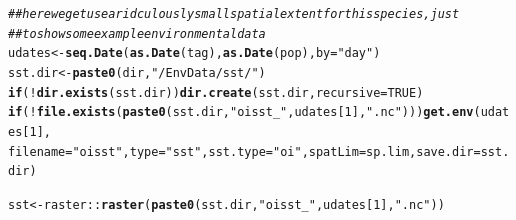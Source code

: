 \documentclass{article}\usepackage[]{graphicx}\usepackage[]{color}
\makeatletter
\newcommand{\hlnum}[1]{\textcolor[rgb]{0.686,0.059,0.569}{#1}}%
\newcommand{\hlstr}[1]{\textcolor[rgb]{0.192,0.494,0.8}{#1}}%
\newcommand{\hlcom}[1]{\textcolor[rgb]{0.678,0.584,0.686}{\textit{#1}}}%
\newcommand{\hlopt}[1]{\textcolor[rgb]{0,0,0}{#1}}%
\newcommand{\hlstd}[1]{\textcolor[rgb]{0.345,0.345,0.345}{#1}}%
\newcommand{\hlkwa}[1]{\textcolor[rgb]{0.161,0.373,0.58}{\textbf{#1}}}%
\newcommand{\hlkwb}[1]{\textcolor[rgb]{0.69,0.353,0.396}{#1}}%
\newcommand{\hlkwc}[1]{\textcolor[rgb]{0.333,0.667,0.333}{#1}}%
\newcommand{\hlkwd}[1]{\textcolor[rgb]{0.737,0.353,0.396}{\textbf{#1}}}%
\newenvironment{kframe}{%
 \def\at@end@of@kframe{}%
 \ifinner\ifhmode%
  \def\at@end@of@kframe{\end{minipage}}%
  \begin{minipage}{\columnwidth}%
 \fi\fi%
 \def\FrameCommand##1{\hskip\@totalleftmargin \hskip-\fboxsep
 \colorbox{shadecolor}{##1}\hskip-\fboxsep
     \hskip-\linewidth \hskip-\@totalleftmargin \hskip\columnwidth}%
 \MakeFramed {\advance\hsize-\width
   \@totalleftmargin\z@ \linewidth\hsize
   \@setminipage}}%
 {\par\unskip\endMakeFramed%
 \at@end@of@kframe}
\newenvironment{knitrout}{}{} %
\makeatother
\begin{document}
\begin{knitrout}\small
{}\color{fgcolor}\begin{kframe}
\begin{alltt}
\hlcom{## here we get use a ridculously small spatial extent for this species, just}
\hlcom{## to show some example environmental data}
\hlstd{udates} \hlkwb{<-} \hlkwd{seq.Date}\hlstd{(}\hlkwd{as.Date}\hlstd{(tag),} \hlkwd{as.Date}\hlstd{(pop),} \hlkwc{by} \hlstd{=} \hlstr{"day"}\hlstd{)}
\hlstd{sst.dir} \hlkwb{<-} \hlkwd{paste0}\hlstd{(dir,} \hlstr{"/EnvData/sst/"}\hlstd{)}
\hlkwa{if} \hlstd{(}\hlopt{!}\hlkwd{dir.exists}\hlstd{(sst.dir))} \hlkwd{dir.create}\hlstd{(sst.dir,} \hlkwc{recursive} \hlstd{=} \hlnum{TRUE}\hlstd{)}
\hlkwa{if} \hlstd{(}\hlopt{!}\hlkwd{file.exists}\hlstd{(}\hlkwd{paste0}\hlstd{(sst.dir,} \hlstr{"oisst_"}\hlstd{, udates[}\hlnum{1}\hlstd{],} \hlstr{".nc"}\hlstd{)))} \hlkwd{get.env}\hlstd{(udates[}\hlnum{1}\hlstd{],}
    \hlkwc{filename} \hlstd{=} \hlstr{"oisst"}\hlstd{,} \hlkwc{type} \hlstd{=} \hlstr{"sst"}\hlstd{,} \hlkwc{sst.type} \hlstd{=} \hlstr{"oi"}\hlstd{,} \hlkwc{spatLim} \hlstd{= sp.lim,} \hlkwc{save.dir} \hlstd{= sst.dir)}

\hlstd{sst} \hlkwb{<-} \hlstd{raster}\hlopt{::}\hlkwd{raster}\hlstd{(}\hlkwd{paste0}\hlstd{(sst.dir,} \hlstr{"oisst_"}\hlstd{, udates[}\hlnum{1}\hlstd{],} \hlstr{".nc"}\hlstd{))}
\end{alltt}



\end{kframe}
\end{knitrout}
\end{document}
